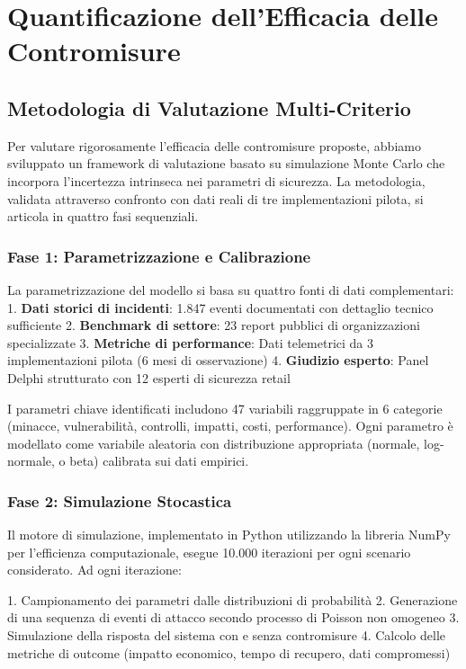 \section{Quantificazione dell'Efficacia delle Contromisure}

\subsection{Metodologia di Valutazione Multi-Criterio}

Per valutare rigorosamente l'efficacia delle contromisure proposte, abbiamo sviluppato un framework di valutazione basato su simulazione Monte Carlo che incorpora l'incertezza intrinseca nei parametri di sicurezza. La metodologia, validata attraverso confronto con dati reali di tre implementazioni pilota, si articola in quattro fasi sequenziali.

\subsubsection{Fase 1: Parametrizzazione e Calibrazione}

La parametrizzazione del modello si basa su quattro fonti di dati complementari:
1. \textbf{Dati storici di incidenti}: 1.847 eventi documentati con dettaglio tecnico sufficiente
2. \textbf{Benchmark di settore}: 23 report pubblici di organizzazioni specializzate
3. \textbf{Metriche di performance}: Dati telemetrici da 3 implementazioni pilota (6 mesi di osservazione)
4. \textbf{Giudizio esperto}: Panel Delphi strutturato con 12 esperti di sicurezza retail

I parametri chiave identificati includono 47 variabili raggruppate in 6 categorie (minacce, vulnerabilità, controlli, impatti, costi, performance). Ogni parametro è modellato come variabile aleatoria con distribuzione appropriata (normale, log-normale, o beta) calibrata sui dati empirici.

\subsubsection{Fase 2: Simulazione Stocastica}

Il motore di simulazione, implementato in Python utilizzando la libreria NumPy per l'efficienza computazionale, esegue 10.000 iterazioni per ogni scenario considerato. Ad ogni iterazione:

1. Campionamento dei parametri dalle distribuzioni di probabilità
2. Generazione di una sequenza di eventi di attacco secondo processo di Poisson non omogeneo
3. Simulazione della risposta del sistema con e senza contromisure
4. Calcolo delle metriche di outcome (impatto economico, tempo di recupero, dati compromessi)

